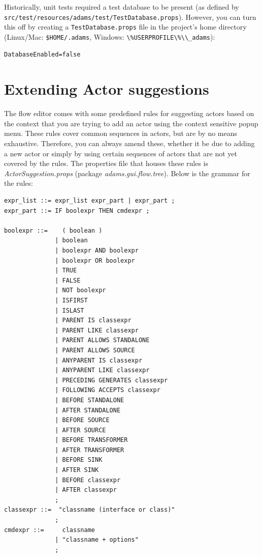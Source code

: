 Historically, unit tests required a test database to be present (as defined by
\verb|src/test/resources/adams/test/TestDatabase.props|). However, you can turn
this off by creating a \texttt{TestDatabase.props} file in the project's home directory
(Linux/Mac: \verb|$HOME/.adams|, Windows: \verb|\%USERPROFILE\%\\_adams|):
\begin{verbatim}
DatabaseEnabled=false
\end{verbatim}

\section{Extending Actor suggestions}
The flow editor comes with some predefined rules for suggesting actors based
on the context that you are trying to add an actor using the context sensitive
popup menu. These rules cover common sequences in actors, but are by no means
exhaustive. Therefore, you can always amend these, whether it be due to adding
a new actor or simply by using certain sequences of actors that are not yet
covered by the rules. The properties file that houses these rules is
\textit{ActorSuggestion.props} (package \textit{adams.gui.flow.tree}).
Below is the grammar for the rules:
{\small \begin{verbatim}
expr_list ::= expr_list expr_part | expr_part ;
expr_part ::= IF boolexpr THEN cmdexpr ;

boolexpr ::=    ( boolean )
              | boolean
              | boolexpr AND boolexpr
              | boolexpr OR boolexpr
              | TRUE
              | FALSE
              | NOT boolexpr
              | ISFIRST
              | ISLAST
              | PARENT IS classexpr
              | PARENT LIKE classexpr
              | PARENT ALLOWS STANDALONE
              | PARENT ALLOWS SOURCE
              | ANYPARENT IS classexpr
              | ANYPARENT LIKE classexpr
              | PRECEDING GENERATES classexpr
              | FOLLOWING ACCEPTS classexpr
              | BEFORE STANDALONE
              | AFTER STANDALONE
              | BEFORE SOURCE
              | AFTER SOURCE
              | BEFORE TRANSFORMER
              | AFTER TRANSFORMER
              | BEFORE SINK
              | AFTER SINK
              | BEFORE classexpr
              | AFTER classexpr
              ;
classexpr ::=  "classname (interface or class)"
              ;
cmdexpr ::=     classname
              | "classname + options"
              ;
\end{verbatim}}

